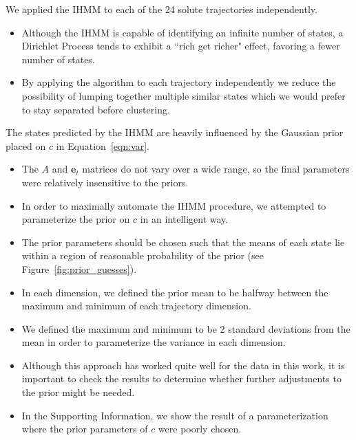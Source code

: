 \documentclass{article}
\begin{document}
  We applied the IHMM to each of the 24 solute trajectories independently.
  \begin{itemize}
    \item Although the IHMM is capable of identifying an infinite number of states, 
    a Dirichlet Process tends to exhibit a ``rich get richer" effect, favoring
    a fewer number of states.
    \item By applying the algorithm to each trajectory independently we reduce
    the possibility of lumping together multiple similar states which we
    would prefer to stay separated before clustering.
  \end{itemize}
  
  The states predicted by the IHMM are heavily influenced by the Gaussian prior
  placed on $c$ in Equation~\ref{eqn:var}.
  \begin{itemize}
    \item The $A$ and $\mathbf{e}_t$ matrices do not vary over a wide range, so
    the final parameters were relatively insensitive to the priors.
    \item In order to maximally automate the IHMM procedure, we attempted to
    parameterize the prior on $c$ in an intelligent way.
    \item The prior parameters should be chosen such that the means of 
    each state lie within a region of reasonable probability of the prior (see
    Figure~\ref{fig:prior_guesses}).
    \item In each dimension, we defined the prior mean to be halfway between the 
    maximum and minimum of each trajectory dimension. 
    \item We defined the maximum and minimum to be 2 standard deviations from
    the mean in order to parameterize the variance in each dimension.
    \item Although this approach has worked quite well for the data in this work,
    it is important to check the results to determine whether further adjustments
    to the prior might be needed.
    \item In the Supporting Information, we show the result of a parameterization
    where the prior parameters of $c$ were poorly chosen.
  \end{itemize}
  
\end{document}
